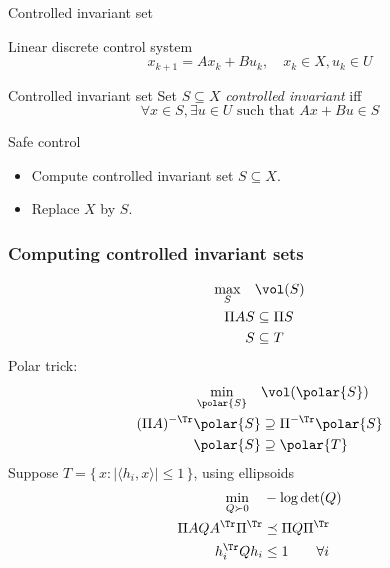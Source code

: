 \documentclass{beamer}
\begin{document}
\begin{frame}{Controlled invariant set}
  \begin{block}{Linear discrete control system}
    \[ x_{k+1} = A x_k + B u_k, \quad x_k \in X, u_k \in U \]
  \end{block}
  \begin{block}{Controlled invariant set}
    Set $S \subseteq X$ \emph{controlled invariant} iff
    \[ \forall x \in S, \exists u \in U \text{ such that } Ax + Bu \in S \]
  \end{block}
  \begin{block}{Safe control}
    \begin{itemize}
      \item Compute controlled invariant set $S \subseteq X$.
      \item Replace $X$ by $S$.
    \end{itemize}
  \end{block}
\end{frame}




\begin{frame}
  \frametitle{Computing controlled invariant sets}
  \vspace{-2em}
  \begin{align*}
    \max_S \quad & \vol(S)\\
    \Pi A S & \subseteq \Pi S\\
    S & \subseteq T
  \end{align*}
  Polar trick:
  \begin{align*}
    \min_{\polar{S}} \quad & \vol(\polar{S})\\
    (\Pi A)^{-\Tr} \polar{S} & \supseteq \Pi^{-\Tr} \polar{S}\\
    \polar{S} & \supseteq \polar{T}
  \end{align*}
  Suppose $T = \{\,x : |\langle h_i, x \rangle| \leq 1\,\}$, using ellipsoids
  \begin{align*}
    \min_{Q \succ 0} \quad & -\log \det(Q)\\
    \Pi A Q A^\Tr \Pi^\Tr & \preceq \Pi Q \Pi^\Tr\\
    h_i^\Tr Q h_i & \le 1 \qquad \forall i
  \end{align*}
\end{frame}
\end{document}
